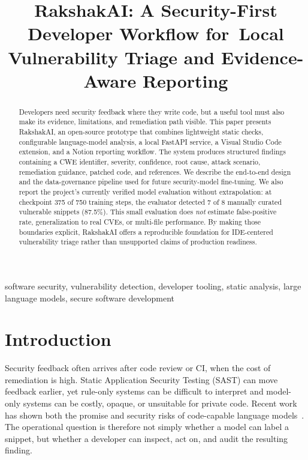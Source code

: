 \documentclass[10pt,conference]{IEEEtran}
\title{RakshakAI: A Security-First Developer Workflow for\
Local Vulnerability Triage and Evidence-Aware Reporting}
\author{\IEEEauthorblockN{RakshakAI Project}
\IEEEauthorblockA{Open-source security engineering prototype\\
\url{https://github.com/Muneerali199/RakshakAI}}}
\begin{document}
\maketitle

\begin{abstract}
Developers need security feedback where they write code, but a useful tool must also make its evidence, limitations, and remediation path visible. This paper presents RakshakAI, an open-source prototype that combines lightweight static checks, configurable language-model analysis, a local FastAPI service, a Visual Studio Code extension, and a Notion reporting workflow. The system produces structured findings containing a CWE identifier, severity, confidence, root cause, attack scenario, remediation guidance, patched code, and references. We describe the end-to-end design and the data-governance pipeline used for future security-model fine-tuning. We also report the project's currently verified model evaluation without extrapolation: at checkpoint 375 of 750 training steps, the evaluator detected 7 of 8 manually curated vulnerable snippets (87.5\%). This small evaluation does \emph{not} estimate false-positive rate, generalization to real CVEs, or multi-file performance. By making those boundaries explicit, RakshakAI offers a reproducible foundation for IDE-centered vulnerability triage rather than unsupported claims of production readiness.
\end{abstract}

\begin{IEEEkeywords}
software security, vulnerability detection, developer tooling, static analysis, large language models, secure software development
\end{IEEEkeywords}

\section{Introduction}
Security feedback often arrives after code review or CI, when the cost of remediation is high. Static Application Security Testing (SAST) can move feedback earlier, yet rule-only systems can be difficult to interpret and model-only systems can be costly, opaque, or unsuitable for private code. Recent work has shown both the promise and security risks of code-capable language models~\cite{pearce2022,chen2021}. The operational question is therefore not simply whether a model can label a snippet, but whether a developer can inspect, act on, and audit the resulting finding.
\end{document}
